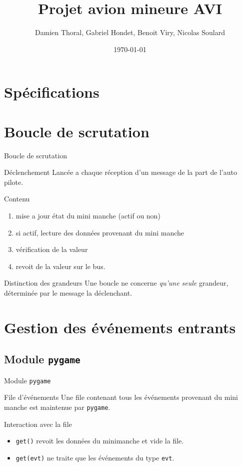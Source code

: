 \documentclass[footheight=2em]{beamer}
\title{Projet avion mineure AVI}
\author{Damien Thoral, Gabriel Hondet, Benoit Viry, Nicolas Soulard}
\date{\today}
\begin{document}
\frame{\titlepage}


\section{Spécifications}

\section{Boucle de scrutation}
\begin{frame}[t]{Boucle de scrutation}
  \begin{block}{Déclenchement}
    Lancée a chaque réception d'un message de la part de l'auto pilote.
  \end{block}

  \begin{block}{Contenu}
    \begin{enumerate}
      \item mise a jour état du mini manche (actif ou non)
      \item si actif, lecture des données provenant du mini manche
      \item vérification de la valeur
      \item revoit de la valeur sur le bus.
    \end{enumerate}
  \end{block}

  \begin{block}{Distinction des grandeurs}
    Une boucle ne concerne \emph{qu'une seule} grandeur, déterminée par le
    message la déclenchant.
  \end{block}
\end{frame}

\section{Gestion des événements entrants}
\subsection{Module \texttt{pygame}}
\begin{frame}[t]{Module \texttt{pygame}}
  \begin{block}{File d'événements}
    Une file contenant tous les événements provenant du mini manche est
    maintenue par \texttt{pygame}.
  \end{block}
  \begin{block}{Interaction avec la file}
    \begin{itemize}
      \item \texttt{get()} revoit les données du minimanche et vide la file.
      \item \texttt{get(evt)} ne traite que les événements du type \texttt{evt}.
    \end{itemize}
  \end{block}
\end{frame}
\end{document}
